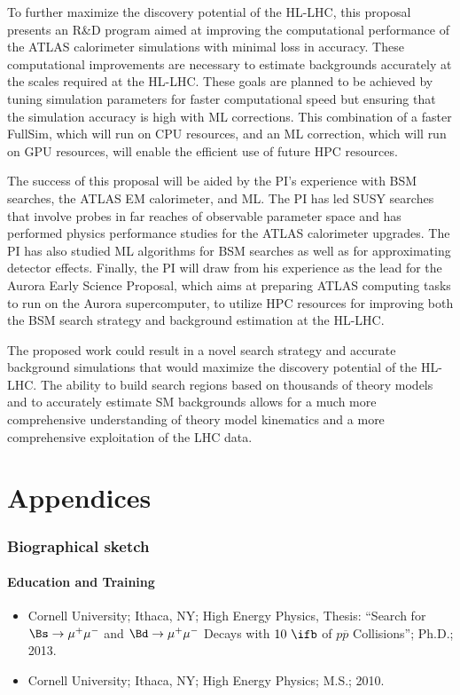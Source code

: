 \documentclass[letter, USenglish, 11pt, subfigure]{article}
\newcommand{\mm}{\ensuremath{\mu^{+}\mu^{-}}}
\newcommand{\bsmm}{\ensuremath{\Bs\to\mm}}
\newcommand{\bdmm}{\ensuremath{\Bd\to\mm}}
\begin{document}
To further maximize the discovery potential of the HL-LHC, this proposal presents an R\&D program aimed at improving the computational performance of the ATLAS calorimeter simulations with minimal loss in accuracy. These computational improvements are necessary to estimate backgrounds accurately at the scales required at the HL-LHC. These goals are planned to be achieved by tuning simulation parameters for faster computational speed but ensuring that the simulation accuracy is high with ML corrections. This combination of a faster FullSim, which will run on CPU resources, and an ML correction, which will run on GPU resources, will enable the efficient use of future HPC resources.

The success of this proposal will be aided by the PI's experience with BSM searches, the ATLAS EM calorimeter, and ML. The PI has led SUSY searches that involve probes in far reaches of observable parameter space and has performed physics performance studies for the ATLAS calorimeter upgrades. The PI has also studied ML algorithms for BSM searches as well as for approximating detector effects. Finally, the PI will draw from his experience as the lead for the Aurora Early Science Proposal, which aims at preparing ATLAS computing tasks to run on the Aurora supercomputer, to utilize HPC resources for improving both the BSM search strategy and background estimation at the HL-LHC.

The proposed work could result in a novel search strategy and accurate background simulations that would maximize the discovery potential of the HL-LHC. The ability to build search regions based on thousands of theory models and to accurately estimate SM backgrounds allows for a much more comprehensive understanding of theory model kinematics and a more comprehensive exploitation of the LHC data.

\clearpage
\appendix
\part*{Appendices}
\section{Biographical sketch}
\subsection{Education and Training}
\begin{itemize}
\item Cornell University; Ithaca, NY; High Energy Physics, Thesis: ``Search for $\bsmm$ and $\bdmm$ Decays with  $10~\ifb$ of ${p\overline{p}}$ Collisions''; Ph.D.; 2013.
\item Cornell University; Ithaca, NY; High Energy Physics; M.S.; 2010.
\end{itemize}
\end{document}
